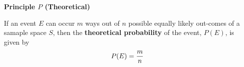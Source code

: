 {\bf Principle $P$ (Theoretical)}
\vskip 6pt

If an event $E$ can occur $m$ ways out of $n$ possible equally likely out-comes of a samaple space $S$, then the {\bf theoretical probability} of the event, $P(E)$, is given by
$$P(E)={m\over n}$$

\vfill\eject
